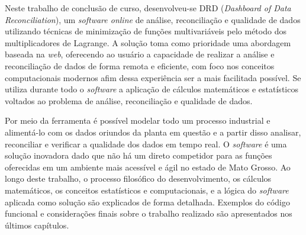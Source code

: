 %
%


Neste trabalho de conclusão de curso, desenvolveu-se DRD (\textit{Dashboard of Data Reconciliation}), um \textit{software online} de análise, reconciliação e qualidade de dados utilizando técnicas de minimização de funções multivariáveis pelo método dos multiplicadores de Lagrange. A solução toma como prioridade uma abordagem baseada na \textit{web}, oferecendo ao usuário a capacidade de realizar a análise e reconciliação de dados de forma remota e eficiente, com foco nos conceitos computacionais modernos afim dessa experiência ser a mais facilitada possível. Se utiliza durante todo o \textit{software} a aplicação de cálculos matemáticos e estatísticos voltados ao problema de análise, reconciliação e qualidade de dados. 
    
Por meio da ferramenta é possível modelar todo um processo industrial e alimentá-lo com os dados oriundos da planta em questão e a partir disso analisar, reconciliar e verificar a qualidade dos dados em tempo real. O \textit{software} é uma solução inovadora dado que não há um direto competidor para as funções oferecidas em um ambiente mais acessível e ágil no estado de Mato Grosso. Ao longo deste trabalho, o processo filosófico do desenvolvimento, os cálculos matemáticos, os conceitos estatísticos e computacionais, e a lógica do \textit{software} aplicada como solução são explicados de forma detalhada. Exemplos do código funcional e considerações finais sobre o trabalho realizado são apresentados nos últimos capítulos.

